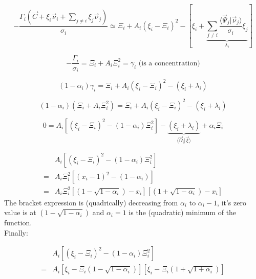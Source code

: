 \documentclass[aps,12pt]{revtex4}
\begin{document}
\begin{equation}
	-\dfrac{\Gamma_i\left(\vec{C}+\xi_i \vec{\nu}_i  + \sum_{j\not= i} \xi_j \vec{\nu}_j \right) }{\sigma_i}  \simeq
	 \Xi_i + A_i \left(\xi_i - \Xi_i\right)^2 - \left[ \xi_i + \underbrace{\sum_{j\not=i}  \dfrac{\langle \vec{\Psi}_j \vert \vec{\nu}_j \rangle}{\sigma_i} \xi_j}_{\lambda_i} \right]
\end{equation}

\begin{equation}
		-\dfrac{\Gamma_i}{\sigma_i} = \Xi_i + A_i \Xi_i^2 = \gamma_i \text{ (is a concentration)}
\end{equation}

\begin{equation}
	(1-\alpha_i) \gamma_i = \Xi_i + A_i \left(\xi_i - \Xi_i\right)^2 - (\xi_i+\lambda_i)
\end{equation}

\begin{equation}
	(1-\alpha_i) (\Xi_i+A_i\Xi_i^2) = \Xi_i + A_i \left(\xi_i - \Xi_i\right)^2 - (\xi_i+\lambda_i)
\end{equation}

\begin{equation}
	0  =  A_i \left[ \left(\xi_i - \Xi_i\right)^2 - (1-\alpha_i) \Xi_i^2\right] - \underbrace{(\xi_i+\lambda_i)}_{\langle \vec{\Omega}_i\vert \vec{\xi} \rangle} + \alpha_i \Xi_i 
\end{equation}

\begin{equation}
\begin{array}{rl}
	&  A_i \left[ \left(\xi_i - \Xi_i\right)^2 - (1-\alpha_i) \Xi_i^2\right] \\
= & A_i \Xi_i^2 \left[ \left(x_i-1\right)^2 - (1-\alpha_i)\right]\\
= & A_i \Xi_i^2 \left[ (1-\sqrt{1-\alpha_i}) - x_i\right] \left[ (1+\sqrt{1-\alpha_i}) - x_i\right]
\end{array}
\end{equation}
The bracket expression is (quadrically) decreasing from $\alpha_i$ to $\alpha_i-1$,
it's zero value is at $(1-\sqrt{1-\alpha_i})$ and $\alpha_i=1$ is the (quadratic) minimum of the function.\\
Finally:

\begin{equation}
\begin{array}{rl}
	&  A_i \left[ \left(\xi_i - \Xi_i\right)^2 - (1-\alpha_i) \Xi_i^2\right] \\
=   &  A_i \left[ \xi_i - \Xi_i \left(1-\sqrt{1-\alpha_i}\right)\right] \left[\xi_i - \Xi_i \left(1 + \sqrt{1+\alpha_i} \right) \right]\\
\end{array}
\end{equation}
\end{document}
